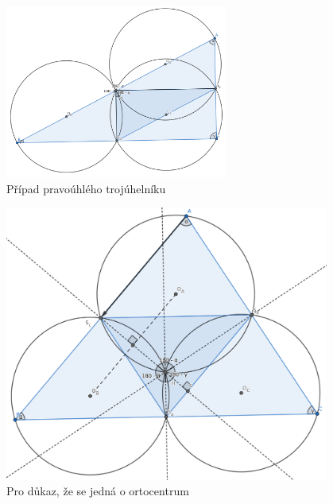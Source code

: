\documentclass{fkssolpub}
\begin{document}
\begin{figure}[h!]
  \begin{center}
    \includegraphics[width=0.65\textwidth]{4-1.png}
  \end{center}
  \caption{Případ pravoúhlého trojúhelníku}\label{fig:right}
\end{figure}

\begin{figure}[h!]
  \begin{center}
    \includegraphics[width=0.95\textwidth]{4-2.png}
  \end{center}
  \caption{Pro důkaz, že se jedná o ortocentrum}\label{fig:2}
\end{figure}
\end{document}
